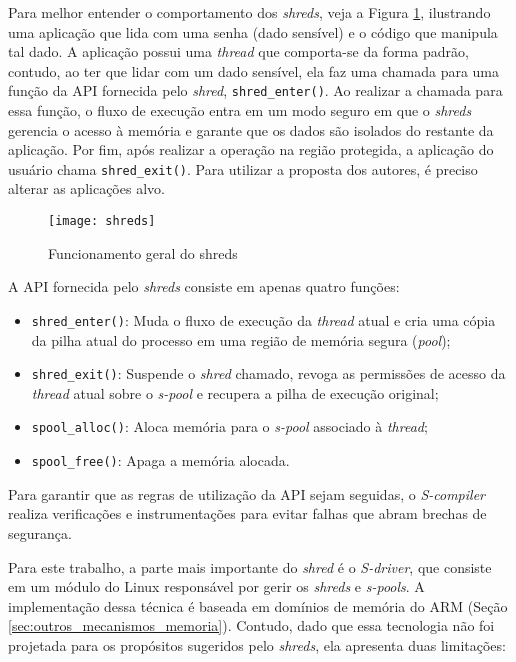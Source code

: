 Para melhor entender o comportamento dos \emph{shreds}, veja a Figura
\ref{fig:shreds}, ilustrando uma aplicação que lida com uma senha (dado
sensível) e o código que manipula tal dado. A aplicação possui uma \emph{thread} que
comporta-se da forma padrão, contudo, ao ter que lidar com um dado sensível, ela
faz uma chamada para uma função da API fornecida pelo \emph{shred},
\texttt{shred\_enter()}. Ao realizar a chamada para essa função, o fluxo de
execução entra em um modo seguro em que o \emph{shreds} gerencia o acesso à
memória e garante que os dados são isolados do restante da aplicação. Por fim,
após realizar a operação na região protegida, a aplicação do usuário chama
\texttt{shred\_exit()}. Para utilizar a proposta dos autores, é preciso alterar
as aplicações alvo.

\begin{figure}[!h]
  \centering
  \texttt{[image: shreds]} 
  \caption{Funcionamento geral do shreds}
  \label{fig:shreds}
\end{figure}

A API fornecida pelo \emph{shreds} consiste em apenas quatro funções:

\begin{itemize}
  \item \texttt{shred\_enter()}: Muda o fluxo de execução da \emph{thread} atual e
        cria uma cópia da pilha atual do processo em uma região de memória
        segura (\emph{pool});
  \item \texttt{shred\_exit()}: Suspende o \emph{shred} chamado, revoga as permissões
        de acesso da \emph{thread} atual sobre o \textit{s-pool} e recupera a pilha de execução
        original;
  \item \texttt{spool\_alloc()}: Aloca memória para o \emph{s-pool} associado à
        \emph{thread};
  \item \texttt{spool\_free()}: Apaga a memória alocada.
\end{itemize}

Para garantir que as regras de utilização da API sejam seguidas, o
\emph{S-compiler} realiza verificações e instrumentações para evitar falhas que
abram brechas de segurança.

Para este trabalho, a parte mais importante do \emph{shred} é o \emph{S-driver},
que consiste em um módulo do Linux responsável por gerir os \emph{shreds} e
\emph{s-pools}. A implementação dessa técnica é baseada em domínios de memória
do ARM (Seção \ref{sec:outros_mecanismos_memoria}). Contudo, dado que essa
tecnologia não foi projetada para os propósitos sugeridos pelo \emph{shreds},
ela apresenta duas limitações:

